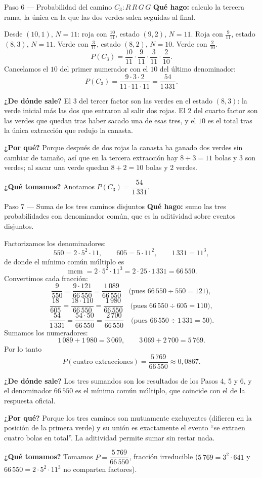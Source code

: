 \documentclass[11pt]{article}
\begin{document}
\begin{paso}{Paso 6 --- Probabilidad del camino $C_3: R\,R\,G\,G$}
\textbf{Qué hago:} calculo la tercera rama, la única en la que las dos verdes salen seguidas al final.

Desde $(10,1)$, $N=11$: roja con $\tfrac{10}{11}$, estado $(9,2)$, $N=11$. Roja con $\tfrac{9}{11}$, estado $(8,3)$, $N=11$. Verde con $\tfrac{3}{11}$, estado $(8,2)$, $N=10$. Verde con $\tfrac{2}{10}$.
\[
P(C_3)=\frac{10}{11}\cdot\frac{9}{11}\cdot\frac{3}{11}\cdot\frac{2}{10}.
\]
Cancelamos el $10$ del primer numerador con el $10$ del último denominador:
\[
P(C_3)=\frac{9\cdot 3\cdot 2}{11\cdot 11\cdot 11}=\frac{54}{1\,331}.
\]

\textbf{¿De dónde sale?} El $3$ del tercer factor son las verdes en el estado $(8,3)$: la verde inicial más las dos que entraron al salir dos rojas. El $2$ del cuarto factor son las verdes que quedan tras haber sacado una de esas tres, y el $10$ es el total tras la única extracción que redujo la canasta.

\textbf{¿Por qué?} Porque después de dos rojas la canasta ha ganado dos verdes sin cambiar de tamaño, así que en la tercera extracción hay $8+3=11$ bolas y $3$ son verdes; al sacar una verde quedan $8+2=10$ bolas y $2$ verdes.

\textbf{¿Qué tomamos?} Anotamos $P(C_3)=\dfrac{54}{1\,331}$.
\end{paso}

\begin{paso}{Paso 7 --- Suma de los tres caminos disjuntos}
\textbf{Qué hago:} sumo las tres probabilidades con denominador común, que es la aditividad sobre eventos disjuntos.

Factorizamos los denominadores:
\[
550=2\cdot 5^{2}\cdot 11,
\qquad
605=5\cdot 11^{2},
\qquad
1\,331=11^{3},
\]
de donde el mínimo común múltiplo es
\[
\operatorname{mcm}=2\cdot 5^{2}\cdot 11^{3}=2\cdot 25\cdot 1\,331=66\,550 .
\]
Convertimos cada fracción:
\[
\frac{9}{550}=\frac{9\cdot 121}{66\,550}=\frac{1\,089}{66\,550}
\quad\text{(pues } 66\,550\div 550=121\text{)},
\]
\[
\frac{18}{605}=\frac{18\cdot 110}{66\,550}=\frac{1\,980}{66\,550}
\quad\text{(pues } 66\,550\div 605=110\text{)},
\]
\[
\frac{54}{1\,331}=\frac{54\cdot 50}{66\,550}=\frac{2\,700}{66\,550}
\quad\text{(pues } 66\,550\div 1\,331=50\text{)}.
\]
Sumamos los numeradores:
\[
1\,089+1\,980=3\,069,
\qquad
3\,069+2\,700=5\,769 .
\]
Por lo tanto
\[
P(\text{cuatro extracciones})=\frac{5\,769}{66\,550}\approx 0{,}0867 .
\]

\textbf{¿De dónde sale?} Los tres sumandos son los resultados de los Pasos 4, 5 y 6, y el denominador $66\,550$ es el mínimo común múltiplo, que coincide con el de la respuesta oficial.

\textbf{¿Por qué?} Porque los tres caminos son mutuamente excluyentes (difieren en la posición de la primera verde) y su unión es exactamente el evento ``se extraen cuatro bolas en total''. La aditividad permite sumar sin restar nada.

\textbf{¿Qué tomamos?} Tomamos $P=\dfrac{5\,769}{66\,550}$, fracción irreducible ($5\,769=3^{2}\cdot 641$ y $66\,550=2\cdot 5^{2}\cdot 11^{3}$ no comparten factores).
\end{paso}
\end{document}
